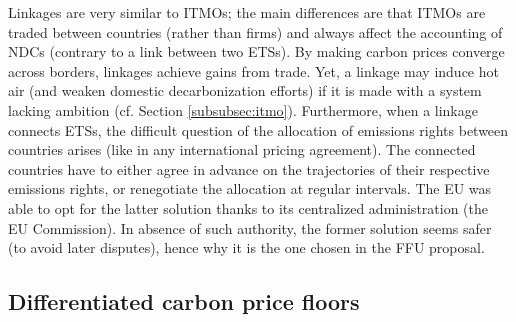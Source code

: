 \documentclass[12pt,english]{article}
\begin{document}
Linkages are very similar to ITMOs; the main differences are that ITMOs are traded between countries (rather than firms) and always affect the accounting of NDCs (contrary to a link between two ETSs). By making carbon prices converge across borders, linkages achieve gains from trade. Yet, a linkage may induce hot air (and weaken domestic decarbonization efforts) if it is made with a system lacking ambition (cf. Section \ref{subsubsec:itmo}). 
Furthermore, when a linkage connects ETSs, the difficult question of the allocation of emissions rights between countries arises (like in any international pricing agreement). The connected countries have to either agree in advance on the trajectories of their respective emissions rights, or renegotiate the allocation at regular intervals. The EU was able to opt for the latter solution thanks to its centralized administration (the EU Commission). In absence of such authority, the former solution seems safer (to avoid later disputes), hence why it is the one chosen in the FFU proposal.

\subsection{Differentiated carbon price floors}
\end{document}
